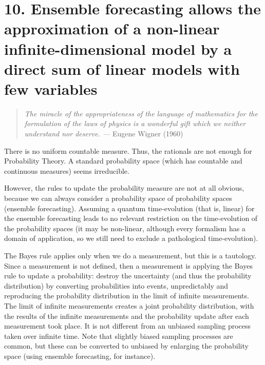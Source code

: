\documentclass[11pt]{book}
\begin{document}
\hypertarget{ensemble-forecasting-allows-the-approximation-of-a-non-linear-infinite-dimensional-model-by-a-direct-sum-of-linear-models-with-few-variables}{%
\section{10. Ensemble forecasting allows the approximation of a
non-linear infinite-dimensional model by a direct sum of linear models
with few
variables}\label{ensemble-forecasting-allows-the-approximation-of-a-non-linear-infinite-dimensional-model-by-a-direct-sum-of-linear-models-with-few-variables}}

\begin{quote}
\emph{The miracle of the appropriateness of the language of mathematics
for the formulation of the laws of physics is a wonderful gift which we
neither understand nor deserve. ---} Eugene Wigner (1960)
\cite{https:ux2fux2fdoi.orgux2f10.1002ux2fcpa.3160130102}
\end{quote}

There is no uniform countable measure. Thus, the rationals are not
enough for Probability Theory. A standard probability space (which has
countable and continuous measures) seems irreducible.

However, the rules to update the probability measure are not at all
obvious, because we can always consider a probability space of
probability spaces (ensemble forecasting). Assuming a quantum
time-evolution (that is, linear) for the ensemble forecasting leads to
no relevant restriction on the time-evolution of the probability spaces
(it may be non-linear, although every formalism has a domain of
application, so we still need to exclude a pathological time-evolution).

The Bayes rule applies only when we do a measurement, but this is a
tautology. Since a measurement is not defined, then a measurement is
applying the Bayes rule to update a probability: destroy the uncertainty
(and thus the probability distribution) by converting probabilities into
events, unpredictably and reproducing the probability distribution in
the limit of infinite measurements. The limit of infinite measurements
creates a joint probability distribution, with the results of the
infinite measurements and the probability update after each measurement
took place. It is not different from an unbiased sampling process taken
over infinite time. Note that slightly biased sampling processes are
common, but these can be converted to unbiased by enlarging the
probability space (using ensemble forecasting, for instance).
\end{document}
